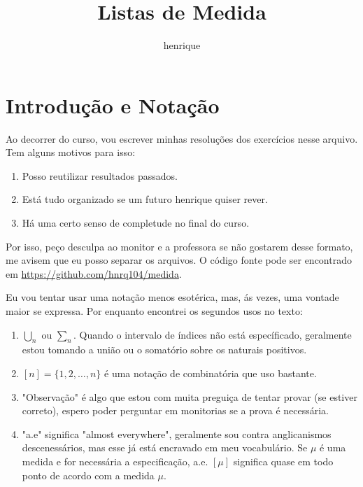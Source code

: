 \documentclass{article}
\author{henrique}
\title{Listas de Medida}
\theoremstyle{definition}
\begin{document}
\maketitle

\tableofcontents
\setcounter{section}{-1}

\section{Introdução e Notação}
Ao decorrer do curso, vou escrever minhas resoluções dos exercícios nesse arquivo. Tem alguns motivos para isso:
\begin{enumerate}
	\item Posso reutilizar resultados passados.
	\item Está tudo organizado se um futuro henrique quiser rever.
	\item Há uma certo senso de completude no final do curso.
\end{enumerate}
Por isso, peço desculpa ao monitor e a professora se não gostarem desse formato, me avisem que eu posso separar os arquivos.
O código fonte pode ser encontrado em \url{https://github.com/hnrq104/medida}.

Eu vou tentar usar uma notação menos esotérica, mas, ás vezes, uma vontade maior se expressa. Por enquanto encontrei os segundos usos no texto:
\begin{enumerate}
	\item $\bigcup_n$ ou $\sum_n$. Quando o intervalo de índices não está específicado, geralmente estou tomando a união ou o somatório
	sobre os naturais positivos.
	\item $[n] = \{1,2,\dots, n\}$ é uma notação de combinatória que uso bastante.
	\item "Observação" é algo que estou com muita preguiça de tentar provar (se estiver correto), 
	espero poder perguntar em monitorias se a prova é necessária.
	\item "a.e" significa "almost everywhere", geralmente sou contra anglicanismos descenessários, mas
	esse já está encravado em meu vocabulário. Se $\mu$ é uma medida e for necessária a especificação,
	a.e. $[\mu]$ significa quase em todo ponto de acordo com a medida $\mu$.
\end{enumerate}













\end{document}
